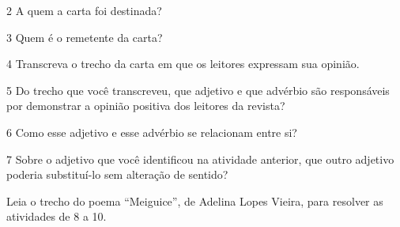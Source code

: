 \num{2} A quem a carta foi destinada?


\num{3} Quem é o remetente da carta?


\num{4} Transcreva o trecho da carta em que os leitores expressam sua opinião.


\num{5} Do trecho que você transcreveu, 
que adjetivo e que advérbio são responsáveis 
por demonstrar a opinião positiva dos leitores da revista?


\num{6} Como esse adjetivo e esse advérbio se relacionam entre si?


\num{7} Sobre o adjetivo que você identificou na atividade anterior, que outro adjetivo poderia substituí-lo sem alteração de sentido?


Leia o trecho do poema ``Meiguice'', de Adelina Lopes Vieira, para resolver as atividades de 8 a 10.

